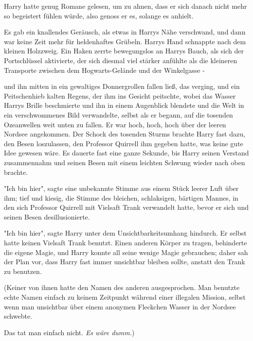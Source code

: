 {Harry hatte genug Romane gelesen, um zu ahnen, dass er sich danach nicht mehr so begeistert fühlen würde, also genoss er es, solange es anhielt.

Es gab ein knallendes Geräusch, als etwas in Harrys Nähe verschwand, und dann war keine Zeit mehr für heldenhaftes Grübeln. Harrys Hand schnappte nach dem kleinen Holzzweig. Ein Haken zerrte bewegungslos an Harrys Bauch, als sich der Portschlüssel aktivierte, der sich diesmal viel stärker anfühlte als die kleineren Transporte zwischen dem Hogwarts-Gelände und der Winkelgasse -

und ihn mitten in ein gewaltiges Donnergrollen fallen ließ, das verging, und ein Peitschenhieb kalten Regens, der ihm ins Gesicht peitschte, wobei das Wasser Harrys Brille beschmierte und ihn in einem Augenblick blendete und die Welt in ein verschwommenes Bild verwandelte, selbst als er begann, auf die tosenden Ozeanwellen weit unten zu fallen. Er war hoch, hoch, hoch über der leeren Nordsee angekommen. Der Schock des tosenden Sturms brachte Harry fast dazu, den Besen loszulassen, den Professor Quirrell ihm gegeben hatte, was keine gute Idee gewesen wäre. Es dauerte fast eine ganze Sekunde, bis Harry seinen Verstand zusammennahm und seinen Besen mit einem leichten Schwung wieder nach oben brachte.

"Ich bin hier", sagte eine unbekannte Stimme aus einem Stück leerer Luft über ihm; tief und kiesig, die Stimme des bleichen, schlaksigen, bärtigen Mannes, in den sich Professor Quirrell mit Vielsaft Trank verwandelt hatte, bevor er sich und seinen Besen desillusionierte.

"Ich bin hier", sagte Harry unter dem Unsichtbarkeitsumhang hindurch. Er selbst hatte keinen Vielsaft Trank benutzt. Einen anderen Körper zu tragen, behinderte die eigene Magie, und Harry konnte all seine wenige Magie gebrauchen; daher sah der Plan vor, dass Harry fast immer unsichtbar bleiben sollte, anstatt den Trank zu benutzen.

(Keiner von ihnen hatte den Namen des anderen ausgesprochen. Man benutzte echte Namen einfach zu keinem Zeitpunkt während einer illegalen Mission, selbst wenn man unsichtbar über einem anonymen Fleckchen Wasser in der Nordsee schwebte.

Das tat man einfach nicht. \emph{Es wäre dumm.})

}
